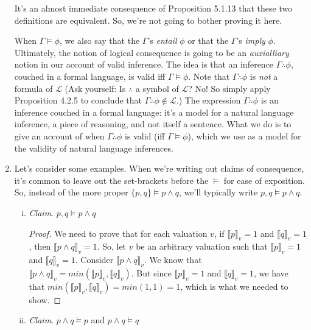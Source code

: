 \begin{enumerate}[\thesection.1]
\begin{itemize}
		\end{itemize}
It's an almost immediate consequence of Proposition 5.1.13 that these two definitions are equivalent. So, we're not going to bother proving it here. 

When $\Gamma\vDash \phi$, we also say that the $\Gamma$'s \emph{entail} $\phi$ or that the $\Gamma$'s \emph{imply} $\phi$. Ultimately, the notion of logical consequence is going to be an \emph{auxialliary} notion in our account of valid inference. The idea is that an inference $\Gamma\therefore \phi$, couched in a formal language, is valid iff $\Gamma\vDash \phi$. Note that $\Gamma\therefore \phi$ is \emph{not} a formula of $\mathcal{L}$ (Ask yourself: Is $\therefore$ a symbol of $\mathcal{L}$? No! So simply apply Proposition 4.2.5 to conclude that $\Gamma\therefore \phi\notin\mathcal{L}$.) The expression $\Gamma\therefore \phi$ is an inference couched in a formal language: it's a model for a natural language inference, a piece of reasoning, and not itself a sentence. What we do is to give an account of when $\Gamma\therefore \phi$ is valid (iff $\Gamma\vDash\phi$), which we use as a model for the validity of natural language inferences.

	\item Let's consider some examples. When we're writing out claims of consequence, it's common to leave out the set-brackets before the $\vDash$ for ease of exposition. So, instead of the more proper $\{p,q\}\vDash p\land q$, we'll typically write $p,q\vDash p\land q$.
	
		\begin{enumerate}[(i)]
		
			\item \emph{Claim}. $p,q\vDash p\land q$
			
			\begin{proof}
			We need to prove that for each valuation $v$, if $\llbracket p\rrbracket_v=1$ and $\llbracket q\rrbracket_v=1$, then $\llbracket p\land q\rrbracket_v=1$. So, let $v$ be an arbitrary valuation such that $\llbracket p\rrbracket_v=1$ and $\llbracket q\rrbracket_v=1$. Consider $\llbracket p\land q\rrbracket_v$. We know that $\llbracket p\land q\rrbracket_v=min(\llbracket p\rrbracket_v, \llbracket q\rrbracket_v)$. But since $\llbracket p\rrbracket_v=1$ and $\llbracket q\rrbracket_v=1$, we have that $min(\llbracket p\rrbracket_v, \llbracket q\rrbracket_v)=min(1,1)=1$, which is what we needed to show.
			\end{proof}
			
			\item \emph{Claim}. $p\land q\vDash p$ and $p\land q\vDash q$
			

\end{enumerate}
\end{enumerate}
